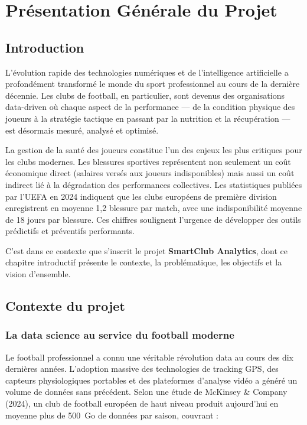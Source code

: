 \chapter{Présentation Générale du Projet}

\section{Introduction}

L'évolution rapide des technologies numériques et de l'intelligence artificielle a profondément transformé le monde du sport professionnel au cours de la dernière décennie. Les clubs de football, en particulier, sont devenus des organisations data-driven où chaque aspect de la performance — de la condition physique des joueurs à la stratégie tactique en passant par la nutrition et la récupération — est désormais mesuré, analysé et optimisé.

La gestion de la santé des joueurs constitue l'un des enjeux les plus critiques pour les clubs modernes. Les blessures sportives représentent non seulement un coût économique direct (salaires versés aux joueurs indisponibles) mais aussi un coût indirect lié à la dégradation des performances collectives. Les statistiques publiées par l'UEFA en 2024 indiquent que les clubs européens de première division enregistrent en moyenne 1,2 blessure par match, avec une indisponibilité moyenne de 18 jours par blessure. Ces chiffres soulignent l'urgence de développer des outils prédictifs et préventifs performants.

C'est dans ce contexte que s'inscrit le projet \textbf{SmartClub Analytics}, dont ce chapitre introductif présente le contexte, la problématique, les objectifs et la vision d'ensemble.

\section{Contexte du projet}

\subsection{La data science au service du football moderne}

Le football professionnel a connu une véritable révolution data au cours des dix dernières années. L'adoption massive des technologies de tracking GPS, des capteurs physiologiques portables et des plateformes d'analyse vidéo a généré un volume de données sans précédent. Selon une étude de McKinsey \& Company (2024), un club de football européen de haut niveau produit aujourd'hui en moyenne plus de 500~Go de données par saison, couvrant :

